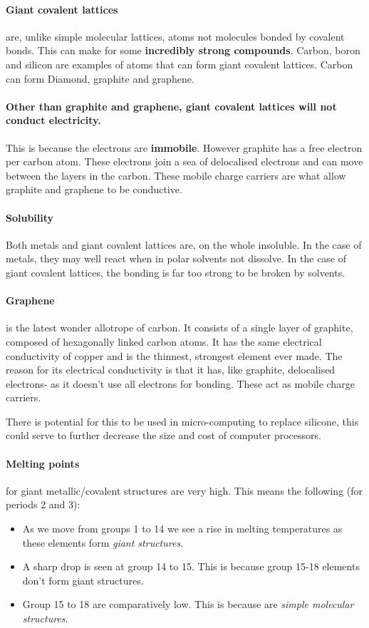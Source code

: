 	\paragraph{Giant covalent lattices} are, unlike simple molecular lattices, atoms not molecules bonded by covalent bonds.
	This can make for some \textbf{incredibly strong compounds}.
	Carbon, boron and silicon are examples of atoms that can form giant covalent lattices.
	Carbon can form Diamond, graphite and graphene.
    \paragraph{Other than graphite and graphene, giant covalent lattices will not conduct electricity.}
	This is because the electrons are \textbf{immobile}. However graphite has a free electron per carbon atom. 
	These electrons join a sea of delocalised electrons and can move between the layers in the carbon.
	These mobile charge carriers are what allow graphite and graphene to be conductive.
	
	\paragraph{Solubility} Both metals and giant covalent lattices are, on the whole insoluble.
	In the case of metals, they may well react when in polar solvents not dissolve.
	In the case of giant covalent lattices, the bonding is far too strong to be broken by solvents.
	
	\paragraph{Graphene} is the latest wonder allotrope of carbon.
	It consists of a single layer of graphite, composed of hexagonally linked carbon atoms.
	It has the same electrical conductivity of copper and is the thinnest, strongest element ever made.
	The reason for its electrical conductivity is that it has, like graphite, delocalised electrons- as it doesn't use all electrons for bonding.
	These act as mobile charge carriers.
	
	There is potential for this to be used in micro-computing to replace silicone, this could serve to further decrease the size and cost of computer processors.
	
	\paragraph{Melting points} for giant metallic/covalent structures are very high.
	This means the following (for periods 2 and 3):
	\begin{itemize}
		\item As we move from groups 1 to 14 we see a rise in melting temperatures as these elements form \textit{giant structures}.
		\item A sharp drop is seen at group 14 to 15. This is because group 15-18 elements don't form giant structures.
		\item Group 15 to 18 are comparatively low. This is because are \textit{simple molecular structures}.
	\end{itemize}
